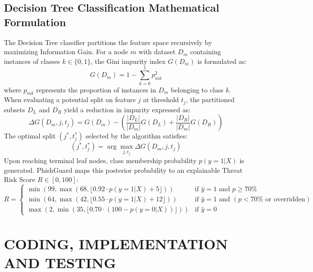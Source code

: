 \documentclass[BTech]{srmuthesis}
\begin{document}
\section{Decision Tree Classification Mathematical Formulation}
The Decision Tree classifier partitions the feature space recursively by maximizing Information Gain. For a node $m$ with dataset $D_m$ containing instances of classes $k \in \{0, 1\}$, the Gini impurity index $G(D_m)$ is formulated as:
\begin{equation}
G(D_m) = 1 - \sum_{k=0}^{1} p_{mk}^2
\label{eq:gini}
\end{equation}
where $p_{mk}$ represents the proportion of instances in $D_m$ belonging to class $k$. When evaluating a potential split on feature $j$ at threshold $t_j$, the partitioned subsets $D_L$ and $D_R$ yield a reduction in impurity expressed as:
\begin{equation}
\Delta G(D_m, j, t_j) = G(D_m) - \left( \frac{|D_L|}{|D_m|} G(D_L) + \frac{|D_R|}{|D_m|} G(D_R) \right)
\label{eq:gain}
\end{equation}
The optimal split $(j^*, t_j^*)$ selected by the algorithm satisfies:
\begin{equation}
(j^*, t_j^*) = \arg\max_{j, t_j} \Delta G(D_m, j, t_j)
\label{eq:opt_split}
\end{equation}
Upon reaching terminal leaf nodes, class membership probability $p(y=1|X)$ is generated. PhishGuard maps this posterior probability to an explainable Threat Risk Score $R \in [0, 100]$:
\begin{equation}
R = 
\begin{cases} 
\min\left(99, \max(68, \lfloor 0.92 \cdot p(y=1|X) + 5 \rfloor)\right) & \text{if } \hat{y} = 1 \text{ and } p \ge 70\% \\
\min\left(64, \max(42, \lfloor 0.55 \cdot p(y=1|X) + 12 \rfloor)\right) & \text{if } \hat{y} = 1 \text{ and } (p < 70\% \text{ or overridden}) \\
\max\left(2, \min(35, \lfloor 0.70 \cdot (100 - p(y=0|X)) \rfloor)\right) & \text{if } \hat{y} = 0 
\end{cases}
\label{eq:risk_score}
\end{equation}

\chapter{CODING, IMPLEMENTATION AND TESTING}
\label{chap:implementation}
\end{document}

